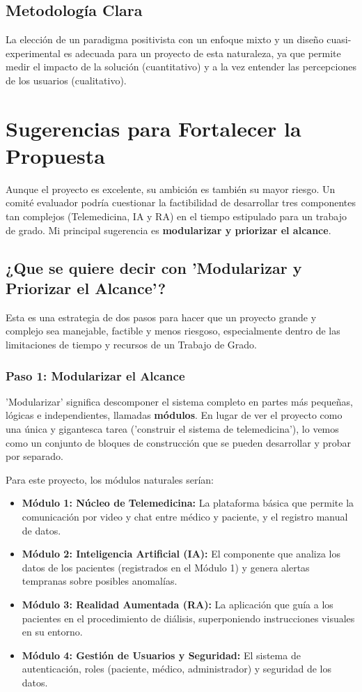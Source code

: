 \documentclass{article}
\begin{document}
\subsection{Metodología Clara}
La elección de un paradigma positivista con un enfoque mixto y un diseño cuasi-experimental es adecuada para un proyecto de esta naturaleza, ya que permite medir el impacto de la solución (cuantitativo) y a la vez entender las percepciones de los usuarios (cualitativo).

\section{Sugerencias para Fortalecer la Propuesta}

Aunque el proyecto es excelente, su ambición es también su mayor riesgo. Un comité evaluador podría cuestionar la factibilidad de desarrollar tres componentes tan complejos (Telemedicina, IA y RA) en el tiempo estipulado para un trabajo de grado. Mi principal sugerencia es \textbf{modularizar y priorizar el alcance}.

\subsection{¿Que se quiere decir con \textbf{'Modularizar y Priorizar el Alcance'}?}

Esta es una estrategia de dos pasos para hacer que un proyecto grande y complejo sea manejable, factible y menos riesgoso, especialmente dentro de las limitaciones de tiempo y recursos de un Trabajo de Grado.

\subsubsection{Paso 1: Modularizar el Alcance}

'Modularizar' significa descomponer el sistema completo en partes más pequeñas, lógicas e independientes, llamadas \textbf{módulos}. En lugar de ver el proyecto como una única y gigantesca tarea ('construir el sistema de telemedicina'), lo vemos como un conjunto de bloques de construcción que se pueden desarrollar y probar por separado.

Para este proyecto, los módulos naturales serían:
\begin{itemize}
    \item \textbf{Módulo 1: Núcleo de Telemedicina:} La plataforma básica que permite la comunicación por video y chat entre médico y paciente, y el registro manual de datos.
    \item \textbf{Módulo 2: Inteligencia Artificial (IA):} El componente que analiza los datos de los pacientes (registrados en el Módulo 1) y genera alertas tempranas sobre posibles anomalías.
    \item \textbf{Módulo 3: Realidad Aumentada (RA):} La aplicación que guía a los pacientes en el procedimiento de diálisis, superponiendo instrucciones visuales en su entorno.
    \item \textbf{Módulo 4: Gestión de Usuarios y Seguridad:} El sistema de autenticación, roles (paciente, médico, administrador) y seguridad de los datos.
\end{itemize}
\end{document}
